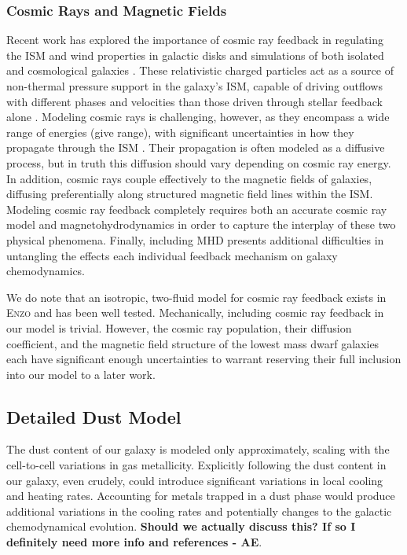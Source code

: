 \documentclass[twocolumn]{aastex61}
\begin{document}
\subsubsection{Cosmic Rays and Magnetic Fields}
Recent work has explored the importance of cosmic ray feedback in regulating the ISM and wind properties in galactic disks \citep{Hanasz2013,GirichidisCR,Simpson2016,Farber2017} and simulations of both isolated \citep{SalemBryanCorlies,Salem2015,Pakmor2016,Ruszkowski2017} and cosmological galaxies \citep{SalemBryanHummels}. These relativistic charged particles act as a source of non-thermal pressure support in the galaxy's ISM, capable of driving outflows with different phases and velocities than those driven through stellar feedback alone \citep{SalemBryanCorlies}. Modeling cosmic rays is challenging, however, as they encompass a wide range of energies (give range), with significant uncertainties in how they propagate through the ISM \citep[e.g.][]{Wiener2017}. Their propagation is often modeled as a diffusive process, but in truth this diffusion should vary depending on cosmic ray energy. In addition, cosmic rays couple effectively to the magnetic fields of galaxies, diffusing preferentially along structured magnetic field lines within the ISM. Modeling cosmic ray feedback completely requires both an accurate cosmic ray model and magnetohydrodynamics in order to capture the interplay of these two physical phenomena. Finally, including MHD presents additional difficulties in untangling the effects each individual feedback mechanism on galaxy chemodynamics.

We do note that an isotropic, two-fluid model for cosmic ray feedback exists in  \textsc{Enzo} \citep{SalemBryan2014,Salem2015} and has been well tested. Mechanically, including cosmic ray feedback in our model is trivial. However, the cosmic ray population, their diffusion coefficient, and the magnetic field structure of the lowest mass dwarf galaxies each have significant enough uncertainties to warrant reserving their full inclusion into our model to a later work.

\subsection{Detailed Dust Model}
The dust content of our galaxy is modeled only approximately, scaling with the cell-to-cell variations in gas metallicity. Explicitly following the dust content in our galaxy, even crudely, could introduce significant variations in local cooling and heating rates. Accounting for metals trapped in a dust phase would produce additional variations in the cooling rates and potentially changes to the galactic chemodynamical evolution. \textbf{Should we actually discuss this? If so I definitely need more info and references - AE}.
\end{document}
